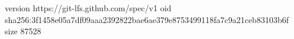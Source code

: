 version https://git-lfs.github.com/spec/v1
oid sha256:3f1458e05a7df09aaa2392822bae6ae379e8753499118fa7c9a21ceb83103b6f
size 87528
